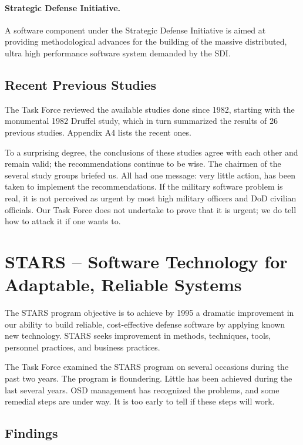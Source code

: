 \documentclass[11pt,final]{article}
\begin{document}
\paragraph{Strategic Defense Initiative.} A software component under the
Strategic Defense Initiative is aimed at providing methodological advances for
the building of the massive distributed, ultra high performance software system
demanded by the SDI.

\subsection{Recent Previous Studies}

The Task Force reviewed the available studies done since 1982, starting with
the monumental 1982 Druffel study, which in turn summarized the results of 26
previous studies. Appendix A4 lists the recent ones.

To a surprising degree, the conclusions of these studies agree with each other
and remain valid; the recommendations continue to be wise. The chairmen of the
several study groups briefed us. All had one message: very little action, has
been taken to implement the recommendations. If the military software problem
is real, it is not perceived as urgent by most high military officers and DoD
civilian officials. Our Task Force does not undertake to prove that it is
urgent; we do tell how to attack it if one wants to.

\section{STARS -- Software Technology for Adaptable, Reliable Systems}

The STARS program objective is to achieve by 1995 a dramatic improvement in our
ability to build reliable, cost-effective defense software by applying known
new technology.  STARS seeks improvement in methods, techniques, tools,
personnel practices, and business practices.

The Task Force examined the STARS program on several occasions during the past
two years. The program is floundering. Little has been achieved during the last
several years. OSD management has recognized the problems, and some remedial
steps are under way. It is too early to tell if these steps will work.

\subsection*{Findings}
\end{document}
